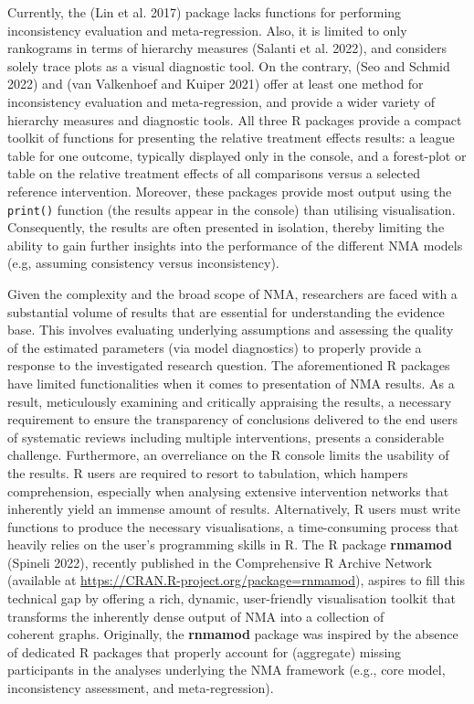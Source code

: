 Currently, the  (Lin et al. 2017) package lacks functions for performing inconsistency evaluation
and meta-regression. Also, it is limited to only rankograms in terms of hierarchy
measures (Salanti et al. 2022), and considers solely trace plots as a visual diagnostic tool.
On the contrary,  (Seo and Schmid 2022) and  (van Valkenhoef and Kuiper 2021) offer at least
one method for inconsistency evaluation and meta-regression, and provide a wider variety of hierarchy measures
and diagnostic tools. All three R packages provide a compact toolkit
of functions for presenting the relative treatment effects results: a league
table for one outcome, typically displayed only in the console, and a forest-plot or table
on the relative treatment effects of all comparisons versus a selected reference intervention.
Moreover, these packages provide most output using the \texttt{print()} function (the results appear in the
console) than utilising visualisation. Consequently, the results are often presented in isolation, thereby limiting
the ability to gain further insights into the performance of the different NMA models
(e.g, assuming consistency versus inconsistency).

Given the complexity and the broad scope of NMA, researchers are faced with
a substantial volume of results that are essential for understanding the evidence base. This involves
evaluating underlying assumptions and assessing the quality of the estimated parameters (via model
diagnostics) to properly provide a response to the investigated research question.
The aforementioned R packages have limited functionalities when it comes to presentation of NMA results.
As a result, meticulously examining and critically appraising the results, a necessary requirement to ensure the transparency
of conclusions delivered to the end users of systematic reviews including multiple interventions, presents a considerable challenge.
Furthermore, an overreliance on the R console limits the usability of the results. R users are required
to resort to tabulation, which hampers comprehension, especially when analysing extensive intervention networks that inherently yield an immense amount
of results. Alternatively, R users must write functions to produce the
necessary visualisations, a time-consuming process that heavily relies on the user's programming skills in R.
The R package \textbf{rnmamod} (Spineli 2022), recently published in the Comprehensive R Archive
Network (available at
\url{https://CRAN.R-project.org/package=rnmamod}),
aspires to fill this technical gap by offering a rich, dynamic, user-friendly
visualisation toolkit that transforms the inherently dense output of NMA into a collection of\\
coherent graphs. Originally, the \textbf{rnmamod} package was inspired by the absence of dedicated
R packages that properly account for (aggregate) missing participants in the analyses
underlying the NMA framework (e.g., core model, inconsistency assessment, and
meta-regression).

